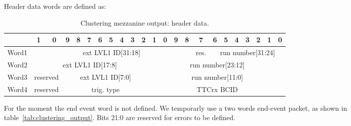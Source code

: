\documentclass[10pt]{article}
\numberwithin{figure}{section}
\numberwithin{equation}{section}
\numberwithin{table}{section}
\newcommand{\0}{\phantom{0}}
\begin{document}
Header data words are defined as: \\
\begin{table}
\begin{tabular}{l|c|c|c|c|c|c|c|c|c|c|c|c|c|c|c|c|c|c|c|c|c|c|}
& 1 & 0 &  9 & 8 & 7 & 6 & 5 & 4 & 3 & 2 & 1 & 0 & 9 & 8 & 7 & 6 & 5 & 4 & 3 & 2 & 1 & 0 \\ \hline
Word1 & \multicolumn{14}{c|}{ext LVL1 ID[31:18]} & res. & \multicolumn{7}{c|}{run number[31:24]} \\\hline
Word2 & \multicolumn{10}{c|}{ext LVL1 ID[17:8]} & \multicolumn{12}{c|}{run number[23:12]} \\\hline
Word3 & \multicolumn{2}{c|}{reserved} & \multicolumn{8}{c|}{ext LVL1 ID[7:0]} & \multicolumn{12}{c|}{run number[11:0]} \\\hline
Word4 & \multicolumn{2}{c|}{reserved} &\multicolumn{8}{c|}{trig. type} &
               \multicolumn{12}{c|}{TTCrx BCID} \\\hline
\end{tabular}
\caption{\label{tab:FTK_IM_OUT_header}Clustering mezzanine output: header data.}
\end{table}
For the moment the end event word is not defined. 
We temporarly use a two words end-event packet, as shown in table~\ref{tab:clustering_output}.
Bits 21:0 are reserved for errors to be defined. 
\\
\end{document}

